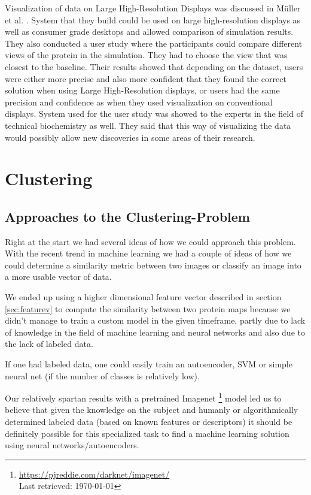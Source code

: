 \documentclass[journal]{vgtc}       %
\newcommand{\todo}[1]{\textcolor{red}{\textbf{TODO:} #1}}
\begin{document}
Visualization of data on Large High-Resolution Displays was discussed in Müller et al. \cite{powerwall}. System that they build could be used on large high-resolution displays as well as consumer grade desktops and allowed comparison of simulation results. They also conducted a user study where the participants could compare different views of the protein in the simulation. They had to choose the view that was closest to the baseline. Their results showed that depending on the dataset, users were either more precise and also more confident that they found the correct solution when using Large High-Resolution displays, or users had the same precision and confidence as when they used visualization on conventional displays. System used for the user study was showed to the experts in the field of technical biochemistry as well. They said that this way of visualizing the data would possibly allow new discoveries in some areas of their research.

\section{Clustering}
\subsection{Approaches to the Clustering-Problem}

Right at the start we had several ideas of how we could approach this problem. 
With the recent trend in machine learning we had a couple of ideas of how we could determine a similarity metric between two images or classify an image into a more usable vector of data.

We ended up using a higher dimensional feature vector described in section \ref{sec:featurev} to  compute the similarity between two protein maps because we didn't manage to train a custom model in the given timeframe, partly due to lack of knowledge in the field of machine learning and neural networks and also due to the lack of labeled data.

If one had labeled data, one could easily train an autoencoder, SVM or simple neural net (if the number of classes is relatively low).

Our relatively spartan results with a pretrained Imagenet \cite{imagenet}\footnote{\url{https://pjreddie.com/darknet/imagenet/} \\ Last retrieved: \today}  model led us to believe that given the knowledge on the subject and humanly or algorithmically determined labeled data (based on known features or descriptors)   it should be definitely possible for this specialized task to find a machine learning  solution using neural networks/autoencoders.
\end{document}
